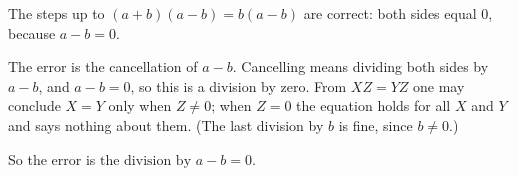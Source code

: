 The steps up to $(a+b)(a-b)=b(a-b)$ are correct: both sides equal $0$, because $a-b=0$.

The error is the cancellation of $a-b$. Cancelling means dividing both sides by $a-b$, and $a-b=0$, so this is a division by zero. From $XZ=YZ$ one may conclude $X=Y$ only when $Z\ne0$; when $Z=0$ the equation holds for all $X$ and $Y$ and says nothing about them. (The last division by $b$ is fine, since $b\ne0$.)

So the error is $\boxed{\text{the division by }a-b=0}$.
